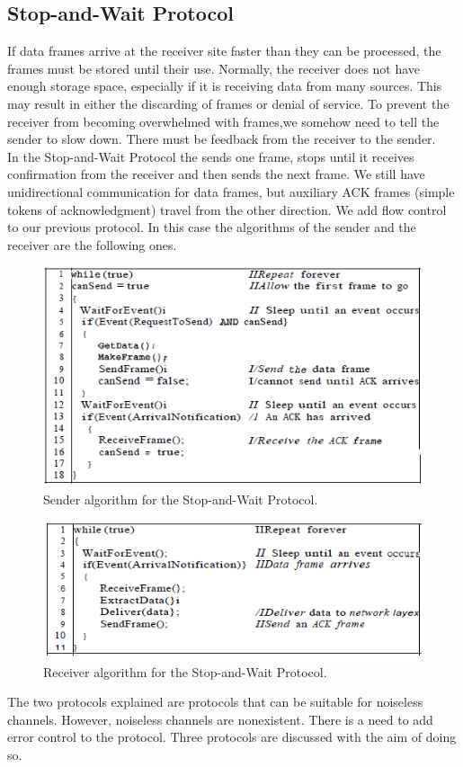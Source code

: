 \documentclass[12pt,a4paper]{report}
\begin{document}
\subsection{Stop-and-Wait Protocol}
If data frames arrive at the receiver site faster than they can be processed, the frames
must be stored until their use. Normally, the receiver does not have enough storage
space, especially if it is receiving data from many sources. This may result in either the
discarding of frames or denial of service. To prevent the receiver from becoming overwhelmed
with frames,we somehow need to tell the sender to slow down. There must be
feedback from the receiver to the sender.\\
In the Stop-and-Wait Protocol the sends one frame, stops until it receives confirmation from the receiver and then sends the next frame. We still have unidirectional communication
for data frames, but auxiliary ACK frames (simple tokens of acknowledgment) travel
from the other direction. We add flow control to our previous protocol. In this case the algorithms of the sender and the receiver are the following ones. 
\begin{figure}[H]
\begin{center}
\includegraphics[scale=1]{sendersawp.PNG} 
\caption{Sender algorithm for the Stop-and-Wait Protocol.}
\end{center}
\end{figure} 
\begin{figure}[H]
\begin{center}
\includegraphics[scale=1]{receiversawp.PNG} 
\caption{Receiver algorithm for the Stop-and-Wait Protocol.}
\end{center}
\end{figure}
The two protocols explained are protocols that can be suitable for noiseless channels. However, noiseless channels are nonexistent. There is a need to add error control to the protocol. Three protocols are discussed with the aim of doing so.
\end{document}
